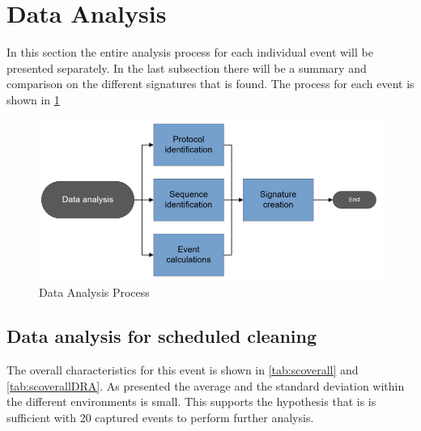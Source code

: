 \section{Data Analysis}
In this section the entire analysis process for each individual event will be presented separately. In the last subsection there will be a summary and comparison on the different signatures that is found. The process for each event is shown in \ref{fig:dataanalysisprocess}

\begin{figure}[H]
    \centering
    \includegraphics[width=\textwidth]{figures/data-analysis-process.png}
    \caption{Data Analysis Process}
    \label{fig:dataanalysisprocess}
\end{figure}



\subsection{Data analysis for scheduled cleaning}
The overall characteristics for this event is shown in \ref{tab:scoverall} and \ref{tab:scoverallDRA}. As presented the average and the standard deviation within the different environments is small. This supports the hypothesis that is is sufficient with 20 captured events to perform further analysis.


